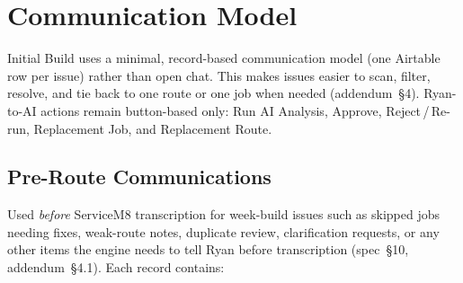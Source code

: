\documentclass[12pt]{article}
\begin{document}
\section*{Communication Model}
\label{sec:comms}

Initial Build uses a minimal, record-based communication model (one Airtable row per issue) rather than open chat.
This makes issues easier to scan, filter, resolve, and tie back to one route or one job when needed (addendum~\S4).
Ryan-to-AI actions remain button-based only: Run AI Analysis, Approve, Reject\,/\,Re-run, Replacement Job, and Replacement Route.

\subsection*{Pre-Route Communications}

Used \emph{before} ServiceM8 transcription for week-build issues such as skipped jobs needing fixes, weak-route notes, duplicate review, clarification requests, or any other items the engine needs to tell Ryan before transcription (spec~\S10, addendum~\S4.1).
Each record contains:
\end{document}

